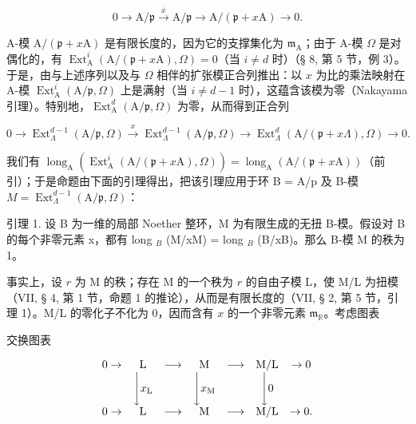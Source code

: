 \[
0 \rightarrow \mathrm{A} / \mathfrak {p} \xrightarrow {\overline {{{x}}}} \mathrm{A} / \mathfrak {p} \longrightarrow \mathrm{A} / (\mathfrak {p} + x \mathrm{A}) \rightarrow 0.
\]

A-模 \(\mathrm{A} / (\mathfrak{p} + x\mathrm{A})\) 是有限长度的，因为它的支撑集化为 \(\mathfrak{m}_{\mathrm{A}}\)；由于 A-模 \(\Omega\) 是对偶化的，有 \(\operatorname{Ext}_{\mathrm{A}}^{i}(\mathrm{A} / (\mathfrak{p} + x\mathrm{A}), \Omega) = 0\)（当 \(i \neq d\) 时）（§ 8, 第 5 节，例 3）。于是，由与上述序列以及与 \(\Omega\) 相伴的扩张模正合列推出：以 \(x\) 为比的乘法映射在 A-模 \(\operatorname{Ext}_{\mathrm{A}}^{i}(\mathrm{A} / \mathfrak{p}, \Omega)\) 上是满射（当 \(i \neq d - 1\) 时），这蕴含该模为零（Nakayama 引理）。特别地，\(\operatorname{Ext}_{\mathrm{A}}^{d}(\mathrm{A} / \mathfrak{p}, \Omega)\) 为零，从而得到正合列

\[
0 \rightarrow \operatorname{Ext} _ {\Lambda} ^ {d - 1} (\mathrm{A} / \mathfrak {p}, \Omega) \xrightarrow {x} \operatorname{Ext} _ {\Lambda} ^ {d - 1} (\mathrm{A} / \mathfrak {p}, \Omega) \longrightarrow \operatorname{Ext} _ {\Lambda} ^ {d} (\mathrm{A} / (\mathfrak {p} + x \Lambda), \Omega) \rightarrow 0.
\]

我们有 \(\operatorname{long}_{\mathrm{A}}(\operatorname{Ext}_{\mathrm{A}}^{i}(\mathrm{A}/(\mathfrak{p}+x\mathrm{A}),\Omega))=\operatorname{long}_{\mathrm{A}}(\mathrm{A}/(\mathfrak{p}+x\mathrm{A}))\)（前引）；于是命题由下面的引理得出，把该引理应用于环 B = A/p 及 B-模 \(M=\operatorname{Ext}_{\Lambda}^{d-1}(\mathrm{A}/\mathfrak{p},\Omega)\)：

引理 1. 设 B 为一维的局部 Noether 整环，M 为有限生成的无扭 B-模。假设对 B 的每个非零元素 x，都有 long \(_{B}\) (M/xM) = long \(_{B}\) (B/xB)。那么 B-模 M 的秩为 1。

事实上，设 \(r\) 为 M 的秩；存在 M 的一个秩为 \(r\) 的自由子模 L，使 M/L 为扭模（VII, § 4, 第 1 节，命题 1 的推论），从而是有限长度的（VII, § 2, 第 5 节，引理 1）。M/L 的零化子不化为 0，因而含有 \(x\) 的一个非零元素 \(\mathfrak{m}_{\mathbb{R}}\)。考虑图表

交换图表

\[
\begin{array}{c c c c c c c} 0 \to & \mathrm{L} & \longrightarrow & \mathrm{M} & \longrightarrow & \mathrm{M} / \mathrm{L} & \to 0 \\ & \Biggl \downarrow x _ {\mathrm{L}} & & \Biggl \downarrow x _ {\mathrm{M}} & & \Biggl \downarrow 0 \\ 0 \to & \mathrm{L} & \longrightarrow & \mathrm{M} & \longrightarrow & \mathrm{M} / \mathrm{L} & \to 0. \end{array}
\]

